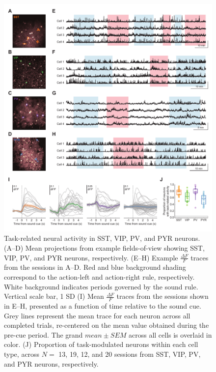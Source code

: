 \begin{figure}[htbp]

\begin{center}
\includegraphics[width=\textwidth]{Figures/Chapter4/Fig4} 
\end{center}

\caption[Task-related neural activity in SST, VIP, PV, and PYR neurons]
{Task-related neural activity in SST, VIP, PV, and PYR neurons. (A--D) Mean projections from example fields-of-view showing SST, VIP, PV, and PYR neurons, respectively. (E--H) Example $\frac{\Delta F}{F}$ traces from the sessions in A--D. Red and blue background shading correspond to the action-left and action-right rule, respectively. White background indicates periods governed by the sound rule. Vertical scale bar, 1 SD (I) Mean $\frac{\Delta F}{F}$ traces from the sessions shown in E--H, presented as a function of time relative to the sound cue. Grey lines represent the mean trace for each neuron across all completed trials, re-centered on the mean value obtained during the pre-cue period. The grand $\mathit{mean} \pm \mathit{SEM}$ across all cells is overlaid in color. (J) Proportion of task-modulated neurons within each cell type, across $N=$ 13, 19, 12, and 20 sessions from SST, VIP, PV, and PYR neurons, respectively.}

\label{fig:Fig4}
\end{figure}